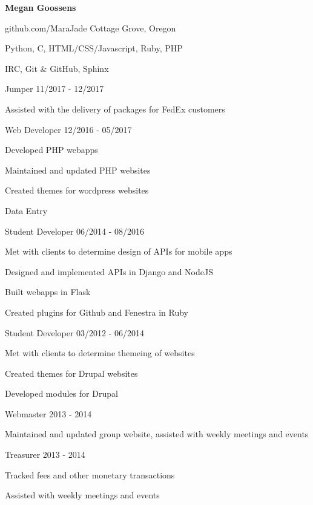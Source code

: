 \documentclass[11pt]{article} %
\begin{document}
\centerline{{\Huge \bf Megan Goossens}}
\bigskip


        {}
        {github.com/MaraJade}
        {Cottage Grove, Oregon}



      {Python, C, HTML/CSS/Javascript, Ruby, PHP}

      {IRC, Git \& GitHub, Sphinx}


\begin{description}

\squish
{}
           {Jumper}
           {11/2017 - 12/2017}

Assisted with the delivery of packages for FedEx customers


\squish
{}
           {Web Developer}
           {12/2016 - 05/2017}

Developed PHP webapps

Maintained and updated PHP websites

Created themes for wordpress websites

Data Entry


           {Student Developer}
           {06/2014 - 08/2016}

Met with clients to determine design of APIs for mobile apps

Designed and implemented APIs in Django and NodeJS

Built webapps in Flask

Created plugins for Github and Fenestra in Ruby


           {Student Developer}
           {03/2012 - 06/2014}

Met with clients to determine themeing of websites

Created themes for Drupal websites

Developed modules for Drupal


\end{description}


\begin{description}
\squish
{}
           {Webmaster}
           {2013 - 2014}

Maintained and updated group website, assisted with weekly meetings and events

           {Treasurer}
           {2013 - 2014}

Tracked fees and other monetary transactions

Assisted with weekly meetings and events


\end{description}
\end{document}
